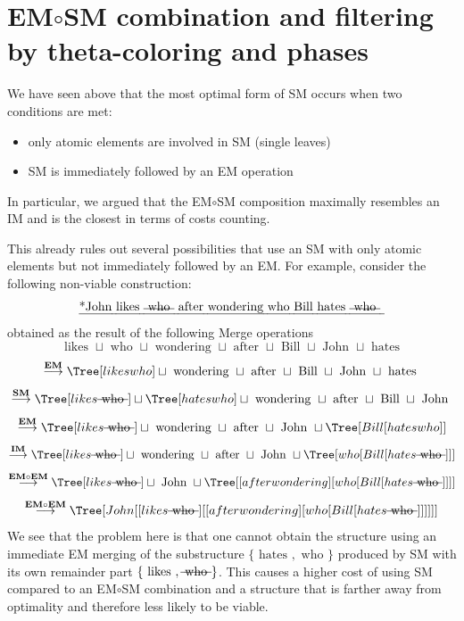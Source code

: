 \documentclass[12pt]{amsart}
\numberwithin{equation}{section}
\begin{document}
\medskip

\section{EM$\circ$SM combination and filtering by theta-coloring and phases}\label{EMSMling}

We have seen above that the most optimal form of SM occurs when two
conditions are met:
\begin{itemize}
\item only atomic elements are involved in SM (single leaves)
\item SM is immediately followed by an EM operation
\end{itemize}

In particular, we argued that the EM$\circ$SM composition maximally
resembles an IM and is the closest in terms of costs counting.

This already rules out several possibilities that use an SM with only atomic
elements but not immediately followed by an EM. For example, consider the
following non-viable construction:
$$ \text{\em *John likes \text{\sout{ who }} after wondering who Bill hates \text{\sout{ who }} } $$
obtained as the result of the following Merge operations
$$ \text{ likes } \sqcup \text{ who } \sqcup \text{ wondering } \sqcup \text{ after } \sqcup \text{ Bill } \sqcup \text{ John } \sqcup \text{ hates } $$ $$ \stackrel{\text{\bf EM}}{\longrightarrow} \Tree[ likes who ] \sqcup \text{ wondering } \sqcup \text{ after } \sqcup \text{ Bill } \sqcup \text{ John } \sqcup \text{ hates } $$
$$ \stackrel{\text{\bf SM}}{\longrightarrow}  \Tree[ likes \text{\sout{ who }} ] \sqcup \Tree[ hates who ] \sqcup 
\text{ wondering } \sqcup \text{ after } \sqcup \text{ Bill } \sqcup \text{ John } 
$$ 
$$
\stackrel{\text{\bf EM}}{\longrightarrow}  \Tree[ likes \text{\sout{ who }} ]  \sqcup  \text{ wondering } \sqcup \text{ after }
\sqcup \text{ John }  \sqcup \Tree[ Bill [ hates who ] ] 
$$
$$
\stackrel{\text{\bf IM}}{\longrightarrow}  \Tree[ likes \text{\sout{ who }} ]  \sqcup  \text{ wondering } \sqcup \text{ after }
\sqcup \text{ John }  \sqcup \Tree[ who [ Bill [ hates \text{\sout{ who }} ] ] ]
$$
$$ 
\stackrel{\text{\bf EM$\circ$EM}}{\longrightarrow} \Tree[ likes \text{\sout{ who }} ] \sqcup \text{ John } \sqcup
\Tree[ [ after wondering ] [ who [ Bill [ hates \text{\sout{ who }} ] ] ] ] 
$$
$$ 
\stackrel{\text{\bf EM$\circ$EM}}{\longrightarrow} \Tree[ John [ [ likes \text{\sout{ who }} ] [ [ after wondering ] [ who [ Bill [ hates \text{\sout{ who }} ] ] ] ] ] ]
$$ 
We see that the problem here is that one cannot obtain the structure using an immediate EM merging 
of the substructure $\{ \text{ hates }, \text{ who } \}$ produced by SM with its own remainder 
part $\{ \text{ likes }, \text{\sout{ who }} \}$. This causes a higher cost of using SM compared to an EM$\circ$SM 
combination and a structure that is farther away from optimality and therefore less likely to be viable. 
\end{document}

